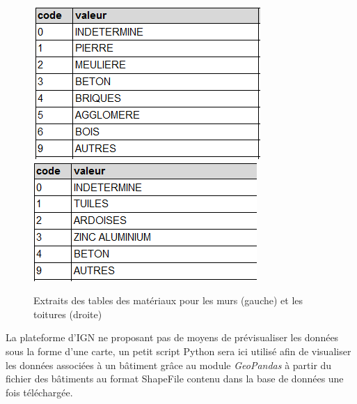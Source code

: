 \documentclass[
  11pt,
  french,
]{article}
\begin{document}
\begin{tcolorbox}
\begin{figure}

{\centering \includegraphics[height=0.3\textheight]{__imgs/matmur} \includegraphics[height=0.3\textheight]{__imgs/mattoit} 

}

\caption[Extraits des tables des matériaux pour les murs (gauche) et les toitures (droite)  -  \url{http://piece-jointe-carto.developpement-durable.gouv.fr/NAT004/DTerNP/html3/annexes/}]{Extraits des tables des matériaux pour les murs (gauche) et les toitures (droite)}\label{fig:mats}
\end{figure}
\end{tcolorbox}

La plateforme d'IGN ne proposant pas de moyens de prévisualiser les
données sous la forme d'une carte, un petit script Python sera ici
utilisé afin de visualiser les données associées à un bâtiment grâce au
module \emph{GeoPandas} à partir du fichier des bâtiments au format
ShapeFile contenu dans la base de données une fois téléchargée.
\end{document}
